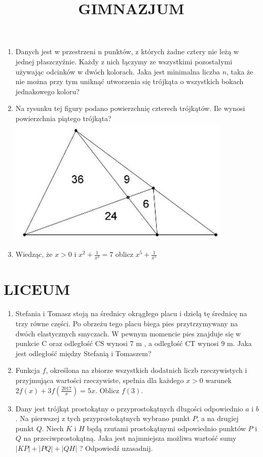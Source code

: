 \documentclass[10pt]{article}
\title{GIMNAZJUM }
\author{}
\date{}
\begin{document}
\maketitle
\begin{enumerate}
  \item Danych jest w przestrzeni n punktów, z których żadne cztery nie leżą w jednej płaszczyźnie. Każdy z nich łączymy ze wszystkimi pozostałymi używając odcinków w dwóch kolorach. Jaka jest minimalna liczba \(n\), taka że nie można przy tym uniknąć utworzenia się trójkąta o wszystkich bokach jednakowego koloru?
  \item Na rysunku tej figury podano powierzchnię czterech trójkątów. Ile wynosi powierzchnia piątego trójkąta?\\
\includegraphics[max width=\textwidth, center]{2024_11_21_2e37a55644ead6a2a668g-1}
  \item Wiedząc, że \(x>0\) i \(x^{2}+\frac{1}{x^{2}}=7\) oblicz \(x^{5}+\frac{1}{x^{5}}\)
\end{enumerate}

\section*{LICEUM}
\begin{enumerate}
  \item Stefania i Tomasz stoją na średnicy okrągłego placu i dzielą tę średnicę na trzy równe części. Po obrzeżu tego placu biega pies przytrzymywany na dwóch elastycznych smyczach. W pewnym momencie pies znajduje się w punkcie C oraz odległość CS wynosi 7 m , a odległość CT wynosi 9 m. Jaka jest odległość między Stefanią i Tomaszem?
  \item Funkcja \(f\), określona na zbiorze wszystkich dodatnich liczb rzeczywistych i przyjmująca wartości rzeczywiste, spełnia dla każdego \(x>0\) warunek \(2 f(x)+3 f\left(\frac{2017}{x}\right)=5 x\). Oblicz \(f(3)\).
  \item Dany jest trójkąt prostokątny o przyprostokątnych długości odpowiednio \(a\) i \(b\). Na pierwszej z tych przyprostokątnych wybrano punkt \(P\), a na drugiej punkt \(Q\). Niech \(K\) i \(H\) będą rzutami prostokątnymi odpowiednio punktów \(P\) i \(Q\) na przeciwprostokątną. Jaka jest najmniejsza możliwa wartość sumy \(|K P|+|P Q|+|Q H|\) ? Odpowiedź uzasadnij.
\end{enumerate}
\end{document}

